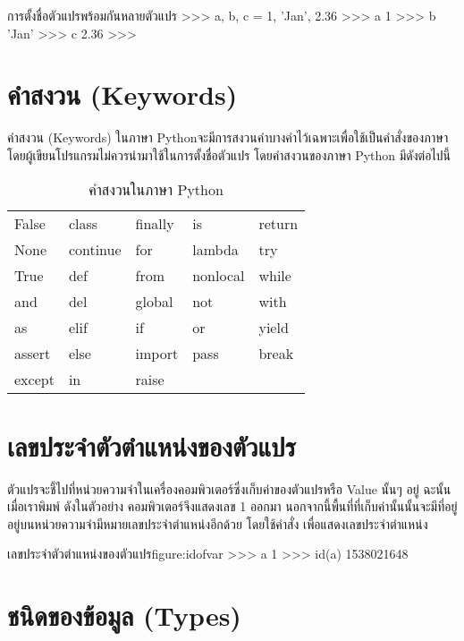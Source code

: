 \begin{codelist}{การตั้งชื่อตัวแปรพร้อมกันหลายตัวแปร}{}
>>> a, b, c = 1, 'Jan', 2.36
>>> a
1
>>> b
'Jan'
>>> c
2.36
>>> 
\end{codelist}


\section{คำสงวน (Keywords)}

คำสงวน (Keywords) ในภาษา Pythonจะมีการสงวนคำบางคำไว้เฉพาะเพื่อใช้เป็นคำสั่งของภาษา โดยผู้เขียนโปรแกรมไม่ควรนำมาใช้ในการตั้งชื่อตัวแปร โดยคำสงวนของภาษา Python มีดังต่อไปนี้ \cite{lutz2014}

\begin{table}[h!]
\caption{คำสงวนในภาษา Python}
\centering
\begin{tabu}{l l l l l}
\rowfont{\ttfamily}
False & class & finally & is & return \\
\rowfont{\ttfamily}
None & continue & for & lambda & try \\
\rowfont{\ttfamily}
True & def & from & nonlocal & while \\
\rowfont{\ttfamily}
and & del & global & not & with \\
\rowfont{\ttfamily}
as & elif & if & or & yield \\
\rowfont{\ttfamily}
assert & else & import & pass & break \\
\rowfont{\ttfamily}
except & in & raise && \\
\end{tabu}
\end{table}


\section{เลขประจำตัวตำแหน่งของตัวแปร}
ตัวแปรจะชี้ไปที่หน่วยความจำในเครื่องคอมพิวเตอร์ซึ่งเก็บค่าของตัวแปรหรือ Value นั้นๆ อยู่ ฉะนั้นเมื่อเราพิมพ์  ดังในตัวอย่าง คอมพิวเตอร์จึงแสดงเลข 1 ออกมา นอกจากนี้พื้นที่ที่เก็บค่านั้นนั้นจะมีที่อยู่อยู่บนหน่วยความจำมีหมายเลขประจำตำแหน่งอีกด้วย โดยใช้คำสั่ง  เพื่อแสดงเลขประจำตำแหน่ง

\begin{codelist}{เลขประจำตัวตำแหน่งของตัวแปร}{figure:idofvar}
>>> a
1
>>> id(a)
1538021648
\end{codelist}

\section{ชนิดของข้อมูล (Types)}

